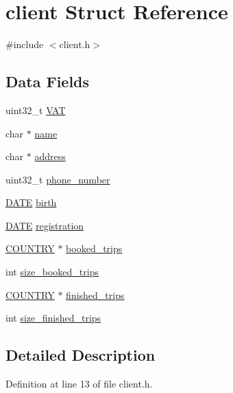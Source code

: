 \hypertarget{structclient}{}\section{client Struct Reference}
\label{structclient}


{\ttfamily \#include $<$client.\+h$>$}

\subsection*{Data Fields}
\begin{DoxyCompactItemize}
\item 
uint32\+\_\+t \hyperlink{structclient_a2fd75feb9757f443ce12debf7274df85}{V\+A\+T}
\item 
char $\ast$ \hyperlink{structclient_a5ac083a645d964373f022d03df4849c8}{name}
\item 
char $\ast$ \hyperlink{structclient_a879a8cdf605d02f8af8b2e216b8764f2}{address}
\item 
uint32\+\_\+t \hyperlink{structclient_adb5dc153ac7e21452ecfd965f1c43734}{phone\+\_\+number}
\item 
\hyperlink{date_8h_a12d5f3ae4ddd219a1574245807ca9588}{D\+A\+T\+E} \hyperlink{structclient_a5048bf506f515ff71b6337104a55b3dd}{birth}
\item 
\hyperlink{date_8h_a12d5f3ae4ddd219a1574245807ca9588}{D\+A\+T\+E} \hyperlink{structclient_ad54b78e7f59dd5d1669b0c0de3952fbf}{registration}
\item 
\hyperlink{trips_8h_a6862c9fc54bae3dce9c2fb4b8b646706}{C\+O\+U\+N\+T\+R\+Y} $\ast$ \hyperlink{structclient_a64455844b82657fa67c0a45988aad665}{booked\+\_\+trips}
\item 
int \hyperlink{structclient_afc622b1d4a5b83c5bdd7de2c423905c5}{size\+\_\+booked\+\_\+trips}
\item 
\hyperlink{trips_8h_a6862c9fc54bae3dce9c2fb4b8b646706}{C\+O\+U\+N\+T\+R\+Y} $\ast$ \hyperlink{structclient_a75a9d663b39a1337a2630f19bab25847}{finished\+\_\+trips}
\item 
int \hyperlink{structclient_aaf9c7a0f87d5d6b722051ed9a079938a}{size\+\_\+finished\+\_\+trips}
\end{DoxyCompactItemize}


\subsection{Detailed Description}


Definition at line 13 of file client.\+h.



